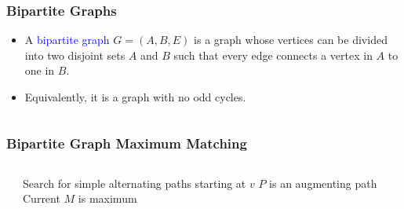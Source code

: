 \documentclass[pdftex]{beamer}
\newcommand{\blue}[1]{\textcolor{blue}{#1}}
\begin{document}
\begin{frame} \frametitle{Bipartite Graphs}
  \begin{itemize}
  \item A \blue{bipartite graph} $G=(A, B, E)$ is a graph whose vertices can be
    divided into two disjoint sets $A$ and $B$ such that every
    edge connects a vertex in $A$ to one in $B$.
  \item Equivalently, it is a graph with no odd cycles.
  \end{itemize}
  \begin{center}
    \begin{columns}
      \begin{column}{.5\textwidth}
        \centering 
      \end{column}
      \begin{column}{.5\textwidth}
        
      \end{column}
    \end{columns}
  \end{center}
\end{frame}

\begin{frame} \frametitle{Bipartite Graph Maximum Matching}
  \vspace{-1ex}
  \begin{columns}[b]
    \begin{column}{.15\textwidth}
    \end{column}
    \begin{column}{.9\textwidth}
      \begin{algorithmic}
        \STATE Search for simple alternating paths starting at $v$
        \STATE $P$ is an augmenting path
        \ENDIF
        \ENDFOR
        \STATE Current $M$ is maximum 
      \end{algorithmic}
    \end{column}
  \end{columns}
  \vspace{1ex}
  \begin{columns}
    \begin{column}{.5\textwidth}
      \centering 
    \end{column}
    \begin{column}{.5\textwidth}
    \end{column}
  \end{columns}
\end{frame}
\end{document}
